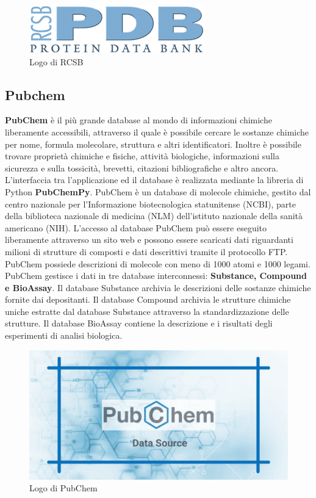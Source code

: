 \begin{figure}[H]
    \centering
    \includegraphics{immagini/capitolo2/RCBSLogo.png}
    \caption{Logo di RCSB}
    \label{fig:RCSB Logo}
\end{figure}

\subsection{Pubchem}
\textbf{PubChem} è il più grande database al mondo di informazioni chimiche liberamente accessibili, attraverso il quale è possibile cercare le sostanze chimiche per nome, formula molecolare, struttura e altri identificatori. Inoltre è possibile trovare proprietà chimiche e fisiche, attività biologiche, informazioni sulla sicurezza e sulla tossicità, brevetti, citazioni bibliografiche e altro ancora. L'interfaccia tra l'applicazione ed il database è realizzata mediante la libreria di Python \textbf{PubChemPy}.\newline
PubChem è un database di molecole chimiche, gestito dal centro nazionale per l'Informazione biotecnologica statunitense (NCBI), parte della biblioteca nazionale di medicina (NLM) dell'istituto nazionale della sanità americano (NIH). L'accesso al database PubChem può essere eseguito liberamente attraverso un sito web e possono essere scaricati dati riguardanti milioni di strutture di composti e dati descrittivi tramite il protocollo FTP. PubChem possiede descrizioni di molecole con meno di 1000 atomi e 1000 legami. \newline 
PubChem gestisce i dati in tre database interconnessi: \textbf{Substance, Compound e BioAssay}. Il database Substance archivia le descrizioni delle sostanze chimiche fornite dai depositanti. \newline
Il database Compound archivia le strutture chimiche uniche estratte dal database Substance attraverso la standardizzazione delle strutture. \newline
Il database BioAssay contiene la descrizione e i risultati degli esperimenti di analisi biologica.

\begin{figure}[H]
    \centering
    \includegraphics[scale=0.3]{immagini/capitolo2/pubChemLogo.png}
    \caption{Logo di PubChem}
    \label{fig:pubChem Logo}
\end{figure}

